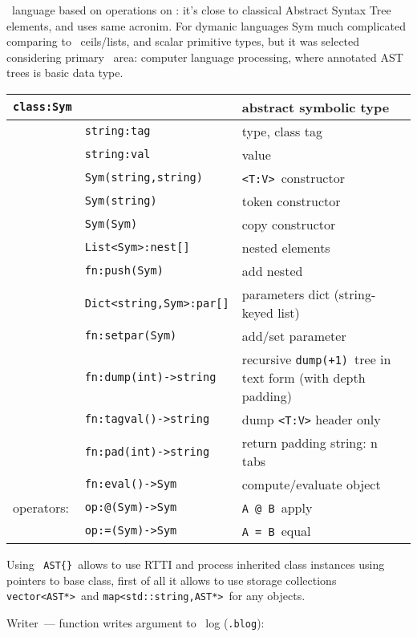 \label{ast}\secdown

\bi\ language based on operations on 
:
it's close to classical Abstract Syntax Tree elements, and 
uses same acronim. 
For dymanic languages Sym much complicated comparing
to \lisp\ ceils/lists, and scalar primitive types,
but it was selected considering primary \bi\ area:
computer language processing, where annotated AST trees is basic data type.

\bigskip
\begin{tabular}{l l l}
\verb|class:Sym| && abstract symbolic type \\
\hline
& \verb|string:tag| & type, class tag \\
& \verb|string:val| & value \\
\hline
& \verb|Sym(string,string)| & \verb|<T:V>|\ constructor \\
& \verb|Sym(string)| & token constructor \\
& \verb|Sym(Sym)| & copy constructor \\
\hline
& \verb|List<Sym>:nest[]| & nested elements \\
& \verb|fn:push(Sym)| & add nested \\
\hline
& \verb|Dict<string,Sym>:par[]| & parameters dict (string-keyed list) \\
& \verb|fn:setpar(Sym)| & add/set parameter \\
\hline
& \verb|fn:dump(int)->string| & recursive \verb|dump(+1)|\ tree in text
form (with depth padding) \\
& \verb|fn:tagval()->string| & dump \verb|<T:V>| header only \\
& \verb|fn:pad(int)->string| & return padding string: n tabs \\
\hline
& \verb|fn:eval()->Sym| & compute/evaluate object \\
operators: & \verb|op:@(Sym)->Sym| & \verb|A @ B|\ apply \\
& \verb|op:=(Sym)->Sym| & \verb|A = B|\ equal \\
\end{tabular} 


Using \ \verb|AST{}|\ allows to use RTTI and process
inherited class instances using pointers to base class, first of all it allows
to use storage collections \verb|vector<AST*>|\ and
\verb|map<std::string,AST*>|\ for any objects.  


Writer\ --- function writes argument to \bi\ log (\verb|.blog|):



\secup
